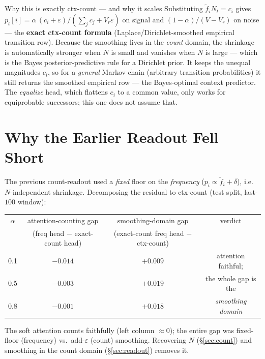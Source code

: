 \documentclass[11pt]{article}
\begin{document}
\begin{takebox}{Why this is exactly ctx-count --- and why it scales}
Substituting $\tilde f_i N_t=c_i$ gives
$p_t[i]=\alpha\,(c_i+\varepsilon)/(\sum_j c_j+V_r\varepsilon)$ on signal and $(1-\alpha)/(V-V_r)$ on
noise --- the \textbf{exact ctx-count formula} (Laplace/Dirichlet-smoothed empirical transition row).
Because the smoothing lives in the \emph{count} domain, the shrinkage is automatically stronger when
$N$ is small and vanishes when $N$ is large --- which is the Bayes posterior-predictive rule for a
Dirichlet prior. It keeps the unequal magnitudes $c_i$, so for a \emph{general} Markov chain (arbitrary
transition probabilities) it still returns the smoothed empirical row --- the Bayes-optimal context
predictor. The \emph{equalize} head, which flattens $c_i$ to a common value, only works for equiprobable
successors; this one does not assume that.
\end{takebox}

\section{Why the Earlier Readout Fell Short}
The previous count-readout used a \emph{fixed} floor on the \emph{frequency}
($p_i\propto \tilde f_i+\delta$), i.e.\ $N$-independent shrinkage. Decomposing the residual to ctx-count
(test split, last-$100$ window):
\begin{center}\small
\begin{tabular}{@{}cccc@{}}
\toprule
$\alpha$ & attention-counting gap & smoothing-domain gap & verdict\\
 & (freq head $-$ exact-count head) & (exact-count freq head $-$ ctx-count) & \\
\midrule
0.1 & $-0.014$ & $+0.009$ & attention faithful;\\
0.5 & $-0.003$ & $+0.019$ & the whole gap is the\\
0.8 & $-0.001$ & $+0.018$ & \emph{smoothing domain}\\
\bottomrule
\end{tabular}
\end{center}
The soft attention counts faithfully (left column $\approx 0$); the entire gap was fixed-floor (frequency)
vs.\ add-$\varepsilon$ (count) smoothing. Recovering $N$ (\S\ref{sec:count}) and smoothing in the count
domain (\S\ref{sec:readout}) removes it.

\end{document}
